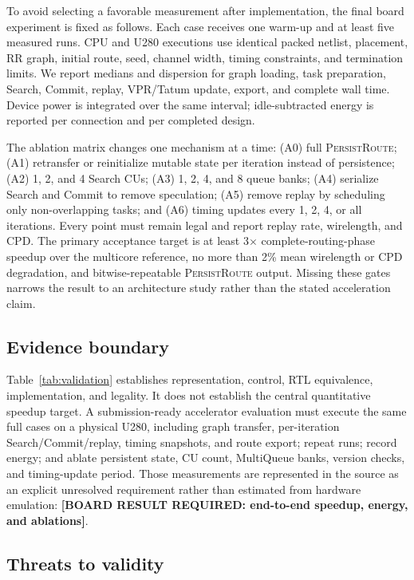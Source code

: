\documentclass[sigconf,anonymous,review]{acmart}
\newcommand{\system}{\textsc{PersistRoute}}
\newcommand{\todoresult}[1]{\textbf{[BOARD RESULT REQUIRED: #1]}}
\begin{document}
To avoid selecting a favorable measurement after implementation, the final
board experiment is fixed as follows. Each case receives one warm-up and at
least five measured runs. CPU and U280 executions use identical packed netlist,
placement, RR graph, initial route, seed, channel width, timing constraints,
and termination limits. We report medians and dispersion for graph loading,
task preparation, Search, Commit, replay, VPR/Tatum update, export, and complete
wall time. Device power is integrated over the same interval; idle-subtracted
energy is reported per connection and per completed design.

The ablation matrix changes one mechanism at a time: (A0) full \system{}; (A1)
retransfer or reinitialize mutable state per iteration instead of persistence;
(A2) 1, 2, and 4 Search CUs; (A3) 1, 2, 4, and 8 queue banks; (A4) serialize
Search and Commit to remove speculation; (A5) remove replay by scheduling only
non-overlapping tasks; and (A6) timing updates every 1, 2, 4, or all iterations.
Every point must remain legal and report replay rate, wirelength, and CPD. The
primary acceptance target is at least 3$\times$ complete-routing-phase speedup over the multicore
reference, no more than 2\% mean wirelength or CPD degradation, and
bitwise-repeatable \system{} output. Missing these gates narrows the result to
an architecture study rather than the stated acceleration claim.

\subsection{Evidence boundary}

Table~\ref{tab:validation} establishes representation, control, RTL equivalence,
implementation, and legality. It does not establish the central quantitative
speedup target. A submission-ready accelerator evaluation must execute the
same full cases on a physical U280, including graph transfer, per-iteration
Search/Commit/replay, timing snapshots, and route export; repeat runs; record
energy; and ablate persistent state, CU count, MultiQueue banks, version checks,
and timing-update period. Those measurements are represented in the source as
an explicit unresolved requirement rather than estimated from hardware
emulation: \todoresult{end-to-end speedup, energy, and ablations}.

\subsection{Threats to validity}
\end{document}
